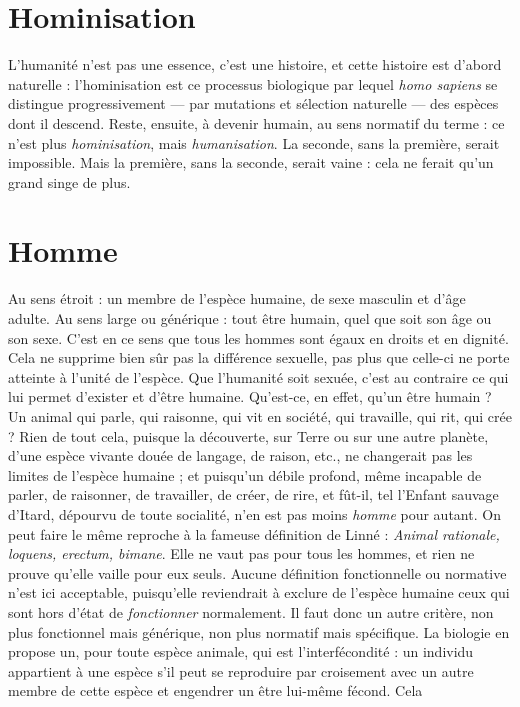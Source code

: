 \section{Hominisation}
L’humanité n’est pas une essence, c’est une histoire, et
cette histoire est d’abord naturelle : l’hominisation est ce
processus biologique par lequel {\it homo sapiens} se distingue progressivement — par
mutations et sélection naturelle — des espèces dont il descend. Reste, ensuite, à
devenir humain, au sens normatif du terme : ce n’est plus {\it hominisation}, mais
{\it humanisation}. La seconde, sans la première, serait impossible. Mais la première,
sans la seconde, serait vaine : cela ne ferait qu’un grand singe de plus.

\section{Homme}
Au sens étroit : un membre de l'espèce humaine, de sexe masculin
et d’âge adulte. Au sens large ou générique : tout être humain,
quel que soit son âge ou son sexe. C’est en ce sens que tous les hommes sont
égaux en droits et en dignité. Cela ne supprime bien sûr pas la différence
sexuelle, pas plus que celle-ci ne porte atteinte à l’unité de l’espèce. Que
l'humanité soit sexuée, c’est au contraire ce qui lui permet d’exister et d’être
humaine. Qu'est-ce, en effet, qu’un être humain ? Un animal qui parle, qui raisonne,
qui vit en société, qui travaille, qui rit, qui crée ? Rien de tout cela,
puisque la découverte, sur Terre ou sur une autre planète, d’une espèce vivante
douée de langage, de raison, etc., ne changerait pas les limites de l’espèce
humaine ; et puisqu’un débile profond, même incapable de parler, de raisonner,
de travailler, de créer, de rire, et fût-il, tel l'Enfant sauvage d’Itard,
dépourvu de toute socialité, n’en est pas moins {\it homme} pour autant. On peut
faire le même reproche à la fameuse définition de Linné : {\it Animal rationale,
loquens, erectum, bimane}. Elle ne vaut pas pour tous les hommes, et rien ne
prouve qu’elle vaille pour eux seuls. Aucune définition fonctionnelle ou normative
n’est ici acceptable, puisqu’elle reviendrait à exclure de l’espèce humaine
ceux qui sont hors d’état de {\it fonctionner} normalement. Il faut donc un autre critère,
non plus fonctionnel mais générique, non plus normatif mais spécifique.
La biologie en propose un, pour toute espèce animale, qui est l’interfécondité :
un individu appartient à une espèce s’il peut se reproduire par croisement avec
un autre membre de cette espèce et engendrer un être lui-même fécond. Cela
